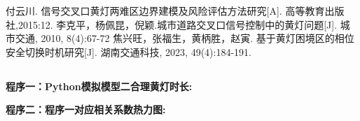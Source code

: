 \documentclass[withoutpreface,bwprint]{cumcmthesis}
\begin{document}
\newpage




\begin{thebibliography}{99}  
	付云川. 信号交叉口黄灯两难区边界建模及风险评估方法研究[A]. 高等教育出版社,2015:12.
	李克平，杨佩昆，倪颖.城市道路交叉口信号控制中的黄灯问题[J]. 城市交通, 2010, 8(4):67-72
	焦兴旺，张福生，黄柄胜，赵寅. 基于黄灯困境区的相位安全切换时机研究[J]. 湖南交通科技, 2023, 49(4):184-191.
\end{thebibliography}
\begin{appendices}
\pagestyle{empty}
\section*{}
\newpage
\textbf{\textcolor[rgb]{0.00,0.00,0.00}{程序一：Python模拟模型二合理黄灯时长:}}


\textbf{\textcolor[rgb]{0.00,0.00,0.00}{程序二：程序一对应相关系数热力图:}}


%
%
%
%
%
%
%
%
%
%
%
%
%
%
%
%
%


%

\end{appendices}
\end{document}
